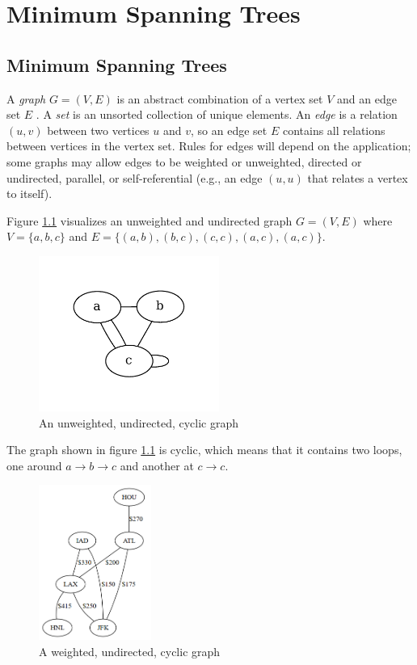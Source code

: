 \documentclass{book}
\begin{document}
\chapter{Minimum Spanning Trees}

\section{Minimum Spanning Trees}

A \textit{graph} $G=(V,E)$ is an abstract combination of a vertex set $V$ and an edge set $E$ \cite{rosen2003discrete}. A \textit{set} is an unsorted collection of unique elements. An \textit{edge} is a relation $(u,v)$ between two vertices $u$ and $v$, so an edge set $E$ contains all relations between vertices in the vertex set. Rules for edges will depend on the application; some graphs may allow edges to be weighted or unweighted, directed or undirected, parallel, or self-referential (e.g., an edge $(u,u)$ that relates a vertex to itself).

Figure \ref{spannABC} visualizes an unweighted and undirected graph $G=(V,E)$ where $V=\{a,b,c\}$ and $E=\{(a,b), (b,c), (c,c), (a,c), (a,c)\}$.

\begin{figure}[ht]
\centering
\includegraphics[height=2in]{figures/spanning-abc}
\caption{An unweighted, undirected, cyclic graph}
\label{spannABC}
\end{figure}

The graph shown in figure \ref{spannABC} is cyclic, which means that it contains two loops, one around $a \to b \to c$ and another at $c \to c$.

\begin{figure}[ht]
\centering
\includegraphics[height=2in]{ch-spann/02}
\caption{A weighted, undirected, cyclic graph}
\label{2}
\end{figure}
\end{document}

